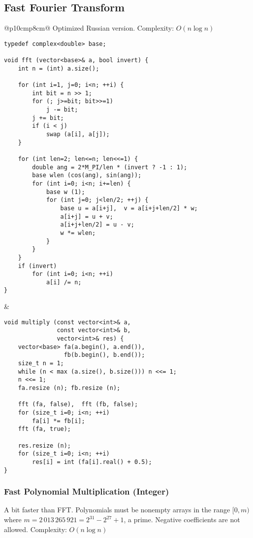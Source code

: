 \documentclass[letterpaper]{article}
\begin{document}
\subsection{Fast Fourier Transform}
\begin{tabular}{@{}p{10cm}p{8cm}@{}}
    Optimized Russian version. Complexity: $O\left(n\log n\right)$

    \begin{lstlisting}
typedef complex<double> base;
 
void fft (vector<base>& a, bool invert) {
	int n = (int) a.size();
 
	for (int i=1, j=0; i<n; ++i) {
		int bit = n >> 1;
		for (; j>=bit; bit>>=1)
			j -= bit;
		j += bit;
		if (i < j)
			swap (a[i], a[j]);
	}
 
	for (int len=2; len<=n; len<<=1) {
		double ang = 2*M_PI/len * (invert ? -1 : 1);
		base wlen (cos(ang), sin(ang));
		for (int i=0; i<n; i+=len) {
			base w (1);
			for (int j=0; j<len/2; ++j) {
				base u = a[i+j],  v = a[i+j+len/2] * w;
				a[i+j] = u + v;
				a[i+j+len/2] = u - v;
				w *= wlen;
			}
		}
	}
	if (invert)
		for (int i=0; i<n; ++i)
			a[i] /= n;
}
\end{lstlisting}
     &
    \begin{lstlisting}
void multiply (const vector<int>& a,
               const vector<int>& b,
               vector<int>& res) {
	vector<base> fa(a.begin(), a.end()),
                 fb(b.begin(), b.end());
	size_t n = 1;
	while (n < max (a.size(), b.size())) n <<= 1;
	n <<= 1;
	fa.resize (n); fb.resize (n);
 
	fft (fa, false),  fft (fb, false);
	for (size_t i=0; i<n; ++i)
		fa[i] *= fb[i];
	fft (fa, true);
 
	res.resize (n);
	for (size_t i=0; i<n; ++i)
		res[i] = int (fa[i].real() + 0.5);
}
\end{lstlisting}
\end{tabular}

\clearpage

\subsubsection{Fast Polynomial Multiplication (Integer)}
A bit faster than FFT. Polynomials must be nonempty arrays in the range $[0, m)$ where $m = 2\,013\,265\,921 = 2^{31} - 2^{27} + 1$, a prime. Negative coefficients are not allowed. Complexity: $O\left(n\log n\right)$
\end{document}
